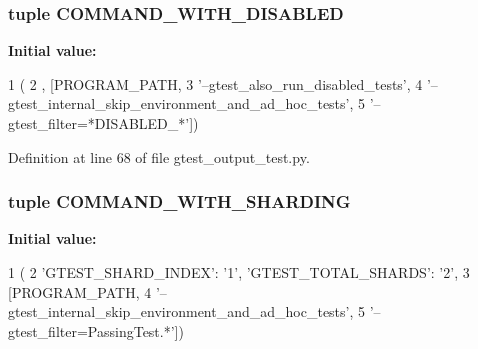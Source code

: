 \hypertarget{namespacegtest__output__test_a70171070f430e6b01d6b6504d47c9f35}{
\subsubsection[{\-C\-O\-M\-M\-A\-N\-D\-\_\-\-W\-I\-T\-H\-\_\-\-D\-I\-S\-A\-B\-L\-E\-D}]{\setlength{\rightskip}{0pt plus 5cm}tuple {\bf \-C\-O\-M\-M\-A\-N\-D\-\_\-\-W\-I\-T\-H\-\_\-\-D\-I\-S\-A\-B\-L\-E\-D}}}\label{d6/dc2/namespacegtest__output__test_a70171070f430e6b01d6b6504d47c9f35}
{\bfseries \-Initial value\-:}
\begin{DoxyCode}
1 (
2     {}, [PROGRAM_PATH,
3          '--gtest_also_run_disabled_tests',
4          '--gtest_internal_skip_environment_and_ad_hoc_tests',
5          '--gtest_filter=*DISABLED_*'])
\end{DoxyCode}


\-Definition at line 68 of file gtest\-\_\-output\-\_\-test.\-py.

\hypertarget{namespacegtest__output__test_a8ddeaaccb2cba2976ca37b95ffc4e6f3}{
\subsubsection[{\-C\-O\-M\-M\-A\-N\-D\-\_\-\-W\-I\-T\-H\-\_\-\-S\-H\-A\-R\-D\-I\-N\-G}]{\setlength{\rightskip}{0pt plus 5cm}tuple {\bf \-C\-O\-M\-M\-A\-N\-D\-\_\-\-W\-I\-T\-H\-\_\-\-S\-H\-A\-R\-D\-I\-N\-G}}}\label{d6/dc2/namespacegtest__output__test_a8ddeaaccb2cba2976ca37b95ffc4e6f3}
{\bfseries \-Initial value\-:}
\begin{DoxyCode}
1 (
2     {'GTEST_SHARD_INDEX': '1', 'GTEST_TOTAL_SHARDS': '2'},
3     [PROGRAM_PATH,
4      '--gtest_internal_skip_environment_and_ad_hoc_tests',
5      '--gtest_filter=PassingTest.*'])
\end{DoxyCode}


